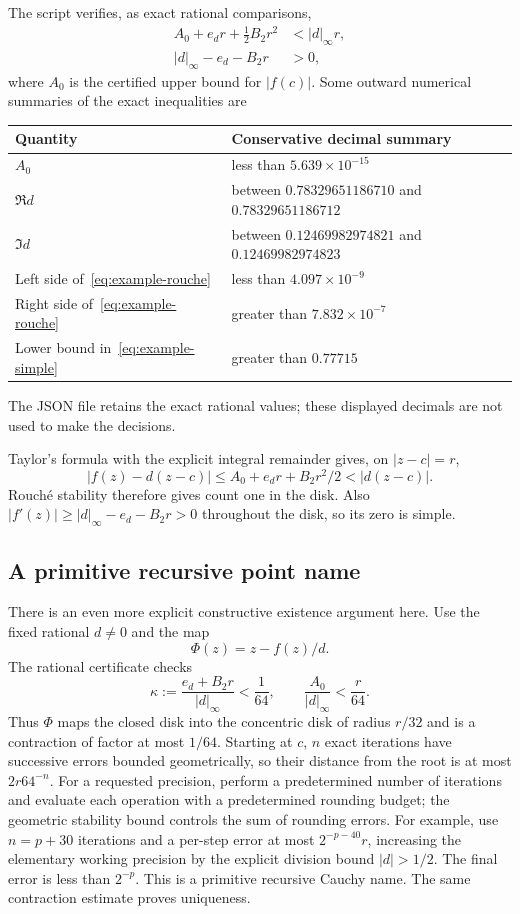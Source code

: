 The script verifies, as exact rational comparisons,
\begin{align}
 A_0+e_dr+\tfrac12B_2r^2&< |d|_\infty r,
       \label{eq:example-rouche}\\
 |d|_\infty-e_d-B_2r&>0,
       \label{eq:example-simple}
\end{align}
where $A_0$ is the certified upper bound for $|f(c)|$.
Some outward numerical summaries of the exact inequalities are
\begin{center}
\begin{tabular}{ll}
\toprule
Quantity & Conservative decimal summary\\
\midrule
$A_0$ & less than $5.639\times10^{-15}$\\
$\Re d$ & between $0.78329651186710$ and $0.78329651186712$\\
$\Im d$ & between $0.12469982974821$ and $0.12469982974823$\\
Left side of~\eqref{eq:example-rouche}
  & less than $4.097\times10^{-9}$\\
Right side of~\eqref{eq:example-rouche}
  & greater than $7.832\times10^{-7}$\\
Lower bound in~\eqref{eq:example-simple}
  & greater than $0.77715$\\
\bottomrule
\end{tabular}
\end{center}
The JSON file retains the exact rational values; these displayed
decimals are not used to make the decisions.

Taylor's formula with the explicit integral remainder gives, on
$|z-c|=r$,
\[
 |f(z)-d(z-c)|\le A_0+e_dr+B_2r^2/2<|d(z-c)|.
\]
Rouch\'e stability therefore gives count one in the disk. Also
$|f'(z)|\ge |d|_\infty-e_d-B_2r>0$ throughout the disk, so its
zero is simple.

\subsection{A primitive recursive point name}
There is an even more explicit constructive existence argument here.
Use the fixed rational $d\ne0$ and the map
\[
             \Phi(z)=z-f(z)/d.
\]
The rational certificate checks
\begin{equation}
 \kappa:=\frac{e_d+B_2r}{|d|_\infty}<\frac1{64},\qquad
 \frac{A_0}{|d|_\infty}<\frac r{64}.
 \label{eq:example-contraction}
\end{equation}
Thus $\Phi$ maps the closed disk into the concentric disk of radius
$r/32$ and is a contraction of factor at most $1/64$.
Starting at $c$, $n$ exact iterations have successive errors bounded
geometrically, so their distance from the root is at most
$2r64^{-n}$. For a requested precision, perform a predetermined
number of iterations and evaluate each operation with a predetermined
rounding budget; the geometric stability bound controls the sum of
rounding errors. For example, use $n=p+30$ iterations and a per-step
error at most $2^{-p-40}r$, increasing the elementary working precision
by the explicit division bound $|d|>1/2$. The final error is less
than $2^{-p}$. This is a primitive recursive Cauchy name. The same
contraction estimate proves uniqueness.


